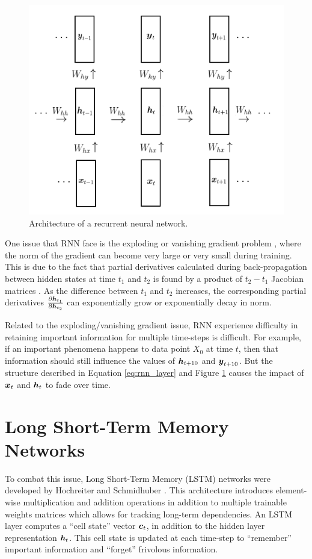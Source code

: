 \begin{figure}[h]
  \centering
  \includegraphics[width=.5\textwidth]{img/rnn_visual.png}
  \caption{Architecture of a recurrent neural network.}
  \label{fig:rnn_visual}
\end{figure}

One issue that RNN face is the exploding or vanishing gradient problem \cite{bengio1994}, where the norm of the gradient can become very large or very small during training. This is due to the fact that partial derivatives calculated during back-propagation between hidden states at time $t_1$ and $t_2$ is found by a product of $t_2 - t_1$ Jacobian matrices \cite{pascanu2013}. As the difference between $t_1$ and $t_2$ increases, the corresponding partial derivatives $\frac{\partial \boldsymbol{h}_{t_1}}{\partial \boldsymbol{h}_{t_2}}$ can exponentially grow or exponentially decay in norm.

Related to the exploding/vanishing gradient issue, RNN experience difficulty in retaining important information for multiple time-steps is difficult. For example, if an important phenomena happens to data point $X_0$ at time $t$, then that information should still influence the values of $\boldsymbol{h}_{t+10}$ and $\boldsymbol{y}_{t+10}$. But the structure described in Equation \ref{eq:rnn_layer} and Figure \ref{fig:rnn_visual} causes the impact of $\boldsymbol{x}_t$ and $\boldsymbol{h}_t$ to fade over time.


\section{Long Short-Term Memory Networks}
To combat this issue, Long Short-Term Memory (LSTM) networks were developed by Hochreiter and Schmidhuber \cite{hochreiter1997}. This architecture introduces element-wise multiplication and addition operations in addition to multiple trainable weights matrices which allows for tracking long-term dependencies. An LSTM layer computes a ``cell state'' vector $\boldsymbol{c}_t$, in addition to the hidden layer representation $\boldsymbol{h}_t$. This cell state is updated at each time-step to ``remember'' important information and ``forget'' frivolous information.


